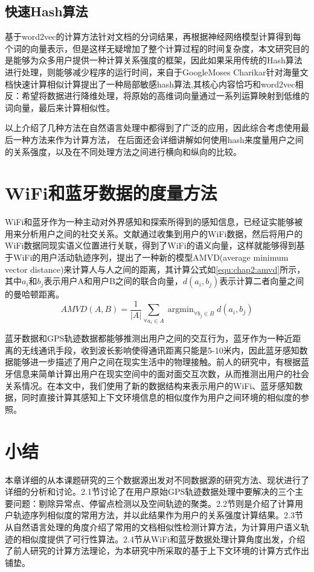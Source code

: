 \subsection{快速Hash算法}
基于word2vec的计算方法针对文档的分词结果，再根据神经网络模型计算得到每个词的向量表示，但是这样无疑增加了整个计算过程的时间复杂度，本文研究目的是能够为众多用户提供一种计算关系强度的框架，因此如果采用传统的Hash算法进行处理，则能够减少程序的运行时间，来自于GoogleMoses Charikar针对海量文档快速计算相似计算提出了一种局部敏感hash算法,其核心内容恰巧和word2vec相反：希望将数据进行降维处理，将原始的高维词向量通过一系列运算映射到低维的词向量，最后来计算相似性。
\par 以上介绍了几种方法在自然语言处理中都得到了广泛的应用，因此综合考虑使用最后一种方法来作为计算方法， 在后面还会详细讲解如何使用hash来度量用户之间的关系强度，以及在不同处理方法之间进行横向和纵向的比较。
\section{WiFi和蓝牙数据的度量方法}
WiFi和蓝牙作为一种主动对外界感知和探索所得到的感知信息，已经证实能够被用来分析用户之间的社交关系。文献\cite{hsu2007mining}通过收集到用户的WiFi数据，然后将用户的WiFi数据同现实语义位置进行关联，得到了WiFi的语义向量，这样就能够得到基于WiFi的用户活动轨迹序列，提出了一种新的模型AMVD(average minimum vector distance)来计算人与人之间的距离，其计算公式如\ref{equ:chap2:amvd}所示，其中$a_{i}$和$b_{j}$表示用户A和用户B之间的联合向量，$d(a_{i},b_{j})$表示计算二者向量之间的曼哈顿距离。
\begin{equation}
\label{equ:chap2:amvd}
AMVD(A,B)=\frac{1}{\left | A \right |}\sum_{\forall a_{i} \in A}^{ }  \mathop{\arg\min}_{\forall b_{j} \in B} d(a_{i},b_{j})
\end{equation}
\par 蓝牙数据和GPS轨迹数据都能够推测出用户之间的交互行为，蓝牙作为一种近距离的无线通讯手段，收到波长影响使得通讯距离只能是5-10米内，因此蓝牙感知数据能够进一步描述了用户之间在现实生活中的物理接触。前人的研究中，有根据蓝牙信息来简单计算出用户在现实空间中的面对面交互次数，从而推测出用户的社会关系情况。在本文中，我们使用了新的数据结构来表示用户的WiFi、蓝牙感知数据，同时直接计算其感知上下文环境信息的相似度作为用户之间环境的相似度的参照。
\section{小结}
\label{sec:section2-4}
本章详细的从本课题研究的三个数据源出发对不同数据源的研究方法、现状进行了详细的分析和讨论。2.1节讨论了在用户原始GPS轨迹数据处理中要解决的三个主要问题：剔除异常点、停留点检测以及空间轨迹的聚类。2.2节则是介绍了计算用户轨迹序列相似度的常用方法，并以此结果作为用户的关系强度计算结果。2.3节从自然语言处理的角度介绍了常用的文档相似性检测计算方法，为计算用户语义轨迹的相似度提供了可行性算法。2.4节从WiFi和蓝牙数据处理计算角度出发，介绍了前人研究的计算方法理论，为本研究中所采取的基于上下文环境的计算方式作出铺垫。
